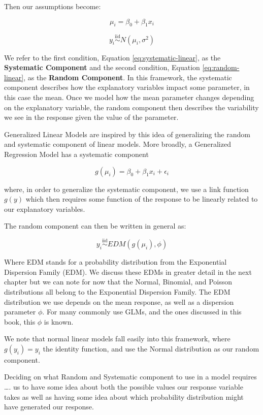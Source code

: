 \documentclass[
]{book}
\begin{document}
Then our assumptions become:

\begin{equation}
\mu_i = \beta_0 + \beta_1 x_i \label{eq:systematic-linear}
\end{equation}

\begin{equation}
y_i \overset{\text{iid}}{\sim} N(\mu_i, \sigma^2)\label{eq:random-linear}
\end{equation}

We refer to the first condition, Equation \eqref{eq:systematic-linear}, as the \textbf{Systematic Component} and the second condition, Equation \eqref{eq:random-linear}, as the \textbf{Random Component}. In this framework, the systematic component describes how the explanatory variables impact some parameter, in this case the mean. Once we model how the mean parameter changes depending on the explanatory variable, the random component then describes the variability we see in the response given the value of the parameter.

Generalized Linear Models are inspired by this idea of generalizing the random and systematic component of linear models. More broadly, a Generalized Regression Model has a systematic component

\[ g(\mu_i) = \beta_0 + \beta_1 x_i + \epsilon_i\]

where, in order to generalize the systematic component, we use a link function \(g(y)\) which then requires some function of the response to be linearly related to our explanatory variables.

The random component can then be written in general as:

\[y_i \overset{\text{iid}}{\sim} EDM(g(\mu_i), \phi) \]

Where EDM stands for a probability distribution from the Exponential Dispersion Family (EDM). We discuss these EDMs in greater detail in the next chapter but we can note for now that the Normal, Binomial, and Poisson distributions all belong to the Exponential Dispersion Family. The EDM distribution we use depends on the mean response, as well as a dispersion parameter \(\phi\). For many commonly use GLMs, and the ones discussed in this book, this \(\phi\) is known.

We note that normal linear models fall easily into this framework, where \(g(y_i) = y_i\) the identity function, and use the Normal distribution as our random component.

Deciding on what Random and Systematic component to use in a model requires \ldots.
us to have some idea about both the possible values our response variable takes as well as having some idea about which probability distribution might have generated our response.
\end{document}
